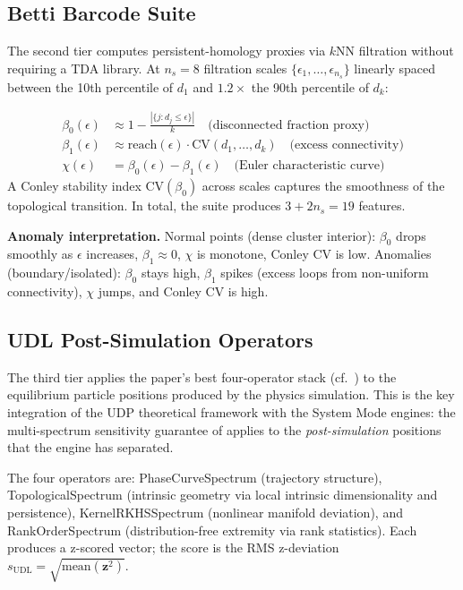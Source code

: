 \documentclass{article}
\begin{document}
\subsection{Betti Barcode Suite}

The second tier computes persistent-homology proxies via $k$NN filtration without requiring a TDA library. At $n_s = 8$ filtration scales $\{\epsilon_1, \ldots, \epsilon_{n_s}\}$ linearly spaced between the 10th percentile of $d_1$ and $1.2\times$ the 90th percentile of $d_k$:\

\begin{align}
\beta_0(\epsilon) &\approx 1 - \frac{|\{j : d_j \leq \epsilon\}|}{k} \quad \text{(disconnected fraction proxy)} \label{eq:beta0}\\
\beta_1(\epsilon) &\approx \text{reach}(\epsilon) \cdot \text{CV}(d_1,\ldots,d_k) \quad \text{(excess connectivity)} \label{eq:beta1}\\
\chi(\epsilon) &= \beta_0(\epsilon) - \beta_1(\epsilon) \quad \text{(Euler characteristic curve)} \label{eq:euler}
\end{align}
A Conley stability index $\text{CV}(\beta_0)$ across scales captures the smoothness of the topological transition. In total, the suite produces $3 + 2n_s = 19$ features.

\textbf{Anomaly interpretation.} Normal points (dense cluster interior): $\beta_0$ drops smoothly as $\epsilon$ increases, $\beta_1 \approx 0$, $\chi$ is monotone, Conley CV is low. Anomalies (boundary/isolated): $\beta_0$ stays high, $\beta_1$ spikes (excess loops from non-uniform connectivity), $\chi$ jumps, and Conley CV is high.

\subsection{UDL Post-Simulation Operators}

The third tier applies the paper's best four-operator stack (cf.\ ) to the equilibrium particle positions produced by the physics simulation. This is the key integration of the UDP theoretical framework with the System Mode engines: the multi-spectrum sensitivity guarantee of  applies to the \emph{post-simulation} positions that the engine has separated.

The four operators are: PhaseCurveSpectrum (trajectory structure), TopologicalSpectrum (intrinsic geometry via local intrinsic dimensionality and persistence), KernelRKHSSpectrum (nonlinear manifold deviation), and RankOrderSpectrum (distribution-free extremity via rank statistics). Each produces a z-scored vector; the score is the RMS z-deviation $s_{\text{UDL}} = \sqrt{\text{mean}(\mathbf{z}^2)}$.
\end{document}

